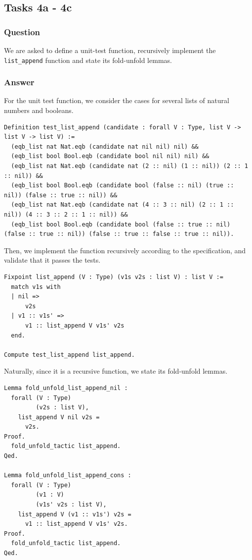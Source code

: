 \documentclass{article}
\begin{document}
\subsection{Tasks 4a - 4c}

\subsubsection{Question}
We are asked to define a unit-test function, recursively implement the \texttt{list\_append} function and state its fold-unfold lemmas.

\subsubsection{Answer}
For the unit test function, we consider the cases for several lists of natural numbers and booleans.

\begin{lstlisting}
Definition test_list_append (candidate : forall V : Type, list V -> list V -> list V) :=
  (eqb_list nat Nat.eqb (candidate nat nil nil) nil) &&
  (eqb_list bool Bool.eqb (candidate bool nil nil) nil) &&
  (eqb_list nat Nat.eqb (candidate nat (2 :: nil) (1 :: nil)) (2 :: 1 :: nil)) &&
  (eqb_list bool Bool.eqb (candidate bool (false :: nil) (true :: nil)) (false :: true :: nil)) &&
  (eqb_list nat Nat.eqb (candidate nat (4 :: 3 :: nil) (2 :: 1 :: nil)) (4 :: 3 :: 2 :: 1 :: nil)) &&
  (eqb_list bool Bool.eqb (candidate bool (false :: true :: nil) (false :: true :: nil)) (false :: true :: false :: true :: nil)).
\end{lstlisting}

Then, we implement the function recursively according to the specification, and validate that it passes the tests.

\begin{lstlisting}
Fixpoint list_append (V : Type) (v1s v2s : list V) : list V :=
  match v1s with
  | nil =>
      v2s
  | v1 :: v1s' =>
      v1 :: list_append V v1s' v2s
  end.

Compute test_list_append list_append.
\end{lstlisting}

Naturally, since it is a recursive function, we state its fold-unfold lemmas. 

\begin{lstlisting}
Lemma fold_unfold_list_append_nil :
  forall (V : Type)
         (v2s : list V),
    list_append V nil v2s =
      v2s.
Proof.
  fold_unfold_tactic list_append.
Qed.

Lemma fold_unfold_list_append_cons :
  forall (V : Type)
         (v1 : V)
         (v1s' v2s : list V),
    list_append V (v1 :: v1s') v2s =
      v1 :: list_append V v1s' v2s.
Proof.
  fold_unfold_tactic list_append.
Qed.
\end{lstlisting}
\end{document}
